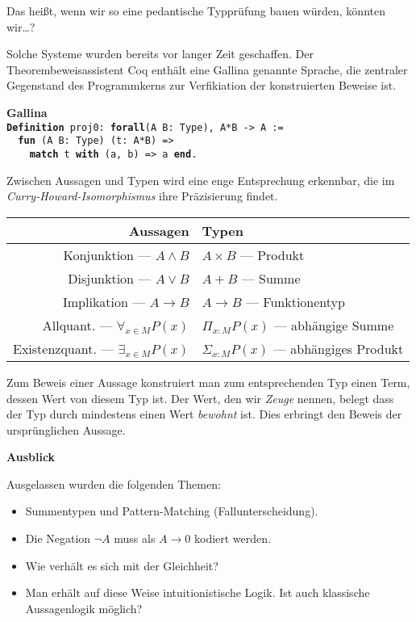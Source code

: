 \documentclass[9pt]{beamer}
\newcommand{\strong}[1]{\textsf{\textbf{#1}}}
\newcommand{\kw}[1]{\textbf{#1}}
\begin{document}
\begin{frame}
Das heißt, wenn wir so eine pedantische Typprüfung bauen würden,
könnten wir\ldots?\pause

\vspace{1em}
Solche Systeme wurden bereits vor langer Zeit geschaffen. Der
Theorembeweisassistent Coq enthält eine Gallina genannte Sprache,
die zentraler Gegenstand des Programmkerns zur Verfikiation der
konstruierten Beweise ist.\pause

\vspace{1em}
\strong{Gallina}\\[4pt]
\texttt{\kw{Definition} proj0: \kw{forall}(A B: Type), A*B -> A :=\\
\ \ \kw{fun} (A B: Type) (t: A*B) =>\\
\ \ \ \ \kw{match} t \kw{with} (a, b) => a \kw{end}.}
\end{frame}

\begin{frame}
Zwischen Aussagen und Typen wird eine enge Entsprechung erkennbar,
die im \emph{Curry-Howard-Isomorphismus} ihre Präzisierung findet.\pause
\begin{table}
\begin{tabular}{rl}
\toprule
\strong{Aussagen} & \strong{Typen}\\
\midrule
Konjunktion --- $A\land B$ & $A\times B$ --- Produkt\\
Disjunktion --- $A\lor B$ & $A+B$ --- Summe\\
Implikation --- $A\to B$ & $A\to B$ --- Funktionentyp\\
Allquant. --- $\forall_{x\in M} P(x)$ & $\Pi_{x\colon M} P(x)$ --- abhängige Summe\\
Existenzquant. --- $\exists_{x\in M} P(x)$ & $\Sigma_{x\colon M}P(x)$ --- abhängiges Produkt\\
\bottomrule
\end{tabular}
\end{table}\pause

Zum Beweis einer Aussage konstruiert man zum entsprechenden Typ
einen Term, dessen Wert von diesem Typ ist. Der Wert, den wir
\emph{Zeuge} nennen, belegt dass der Typ durch mindestens
einen Wert \emph{bewohnt} ist. Dies erbringt den Beweis der
ursprünglichen Aussage.
\end{frame}

\begin{frame}
\strong{Ausblick}

\vspace{1em}
Ausgelassen wurden die folgenden Themen:
\begin{itemize}
\item Summentypen und Pattern-Matching (Fallunterscheidung).
\item Die Negation $\neg A$ muss als $A\to 0$ kodiert werden.
\item Wie verhält es sich mit der Gleichheit?
\item Man erhält auf diese Weise intuitionistische Logik.
  Ist auch klassische Aussagenlogik möglich?
\end{itemize}
\end{frame}
\end{document}
